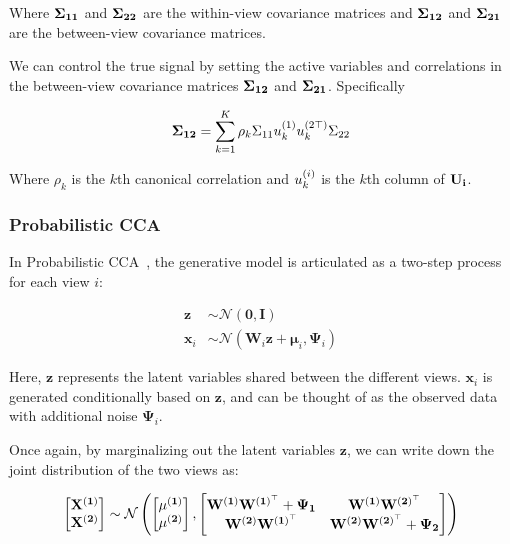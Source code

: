 Where $\bold{\Sigma_{11}}$ and $\bold{\Sigma_{22}}$ are the within-view covariance matrices and $\bold{\Sigma_{12}}$ and $\bold{\Sigma_{21}}$ are the between-view covariance matrices.

We can control the true signal by setting the active variables and correlations in the between-view covariance
matrices $\bold{\Sigma_{12}}$ and $\bold{\Sigma_{21}}$. Specifically

\begin{align}
    \bold{\Sigma_{12}}=\sum_{k=1}^{K}\rho_k\Sigma_{11}u^{(1)}_{k}u^{(2\top)}_k\Sigma_{22}
\end{align}

Where $\rho_k$ is the $k$th canonical correlation and $u^{(i)}_k$ is the $k$th column of $\bold{U_i}$.

\subsubsection{Probabilistic CCA}

In Probabilistic CCA~\cite{bach2005probabilistic}, the generative model is articulated as a two-step process for each view \(i\):

\begin{align}
    \mathbf{z}& \sim \mathcal{N}(\mathbf{0}, \mathbf{I})                                            \\
    \mathbf{x}_i & \sim \mathcal{N}(\mathbf{W}_i \mathbf{z} + \boldsymbol{\mu}_i, \boldsymbol{\Psi}_i)
\end{align}

Here, \(\mathbf{z}\) represents the latent variables shared between the different views. \(\mathbf{x}_i\) is generated conditionally based on \(\mathbf{z}\), and can be thought of as the observed data with additional noise \(\boldsymbol{\Psi}_i\).


Once again, by marginalizing out the latent variables \(\mathbf{z}\), we can write down the joint distribution of the two views as:

\begin{align}
    \begin{bmatrix} \bold{X^{(1)}} \\ \bold{X^{(2)}} \end{bmatrix} \sim \mathcal{N} \left( \begin{bmatrix} \bold{\mu^{(1)}} \\ \bold{\mu^{(2)}} \end{bmatrix}, \begin{bmatrix} \bold{W^{(1)}W^{(1)^{\top}}} + \bold{\Psi_1} & \bold{W^{(1)}W^{(2)^{\top}}} \\ \bold{W^{(2)}W^{(1)^{\top}}} & \bold{W^{(2)}W^{(2)^{\top}}} + \bold{\Psi_2} \end{bmatrix} \right)
\end{align}

